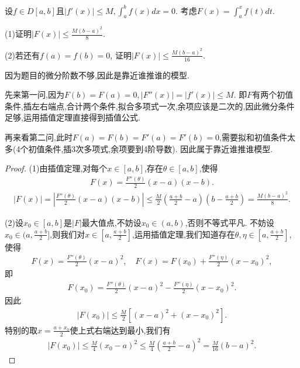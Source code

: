 \documentclass[../../main.tex]{subfiles}
\begin{document}
\begin{example}
设$f \in D[a,b]$且$|f'(x)| \leqslant M, \int_a^b f(x)dx = 0$. 考虑$F(x) = \int_a^x f(t)dt$. 

(1)证明$|F(x)| \leqslant \frac{M(b-a)^2}{8}$. 

(2)若还有$f(a) = f(b) = 0$, 证明$|F(x)| \leqslant \frac{M(b-a)^2}{16}$.
\end{example}
\begin{note}
因为题目的微分阶数不够,因此是靠近谁推谁的模型.

先来第一问,因为$F(b) = F(a) = 0, |F''(x)| = |f'(x)| \leqslant M$. 即$F$有两个初值条件,插左右端点,合计两个条件,拟合多项式一次,余项应该是二次的,因此微分条件足够,运用插值定理直接得到插值公式.

再来看第二问,此时$F(a) = F(b) = F'(a) = F'(b) = 0$,需要拟和初值条件太多(4个初值条件,插3次多项式,余项要到4阶导数). 因此属于靠近谁推谁模型.
\end{note}
\begin{proof}
(1)由插值定理,对每个$x \in [a,b]$,存在$\theta \in [a,b]$,使得
\begin{align*}
F(x) = \frac{F''(\theta)}{2}(x-a)(x-b).
\end{align*}
\begin{align*}
|F(x)| = \left| \frac{F''(\theta)}{2}(x-a)(x-b) \right| \leqslant \frac{M}{2} \left( \frac{a+b}{2} - a \right) \left( b - \frac{a+b}{2} \right) = \frac{M(b-a)^2}{8}.
\end{align*}

(2)设$x_0 \in [a,b]$是$|F|$最大值点,不妨设$x_0 \in (a,b)$,否则不等式平凡.
不妨设$x_0 \in (a, \frac{a+b}{2}]$,则我们对$x \in [a, \frac{a+b}{2}]$,运用插值定理,我们知道存在$\theta, \eta \in [a, \frac{a+b}{2}]$,使得
\begin{align*}
F(x) = \frac{F''(\theta)}{2}(x-a)^2, \quad F(x) = F(x_0) + \frac{F''(\eta)}{2}(x-x_0)^2,
\end{align*}
即
\begin{align*}
F(x_0) = \frac{F''(\theta)}{2}(x-a)^2 - \frac{F''(\eta)}{2}(x-x_0)^2.
\end{align*}
因此
\begin{align*}
|F(x_0)| \leqslant \frac{M}{2} \left[ (x-a)^2 + (x-x_0)^2 \right].
\end{align*}
特别的取$x = \frac{a+x_0}{2}$使上式右端达到最小,我们有
\begin{align*}
|F(x_0)| \leqslant \frac{M}{4}(x_0 - a)^2 \leqslant \frac{M}{4} \left( \frac{a+b}{2} - a \right)^2 = \frac{M}{16}(b-a)^2.
\end{align*}

\end{proof}
\end{document}
